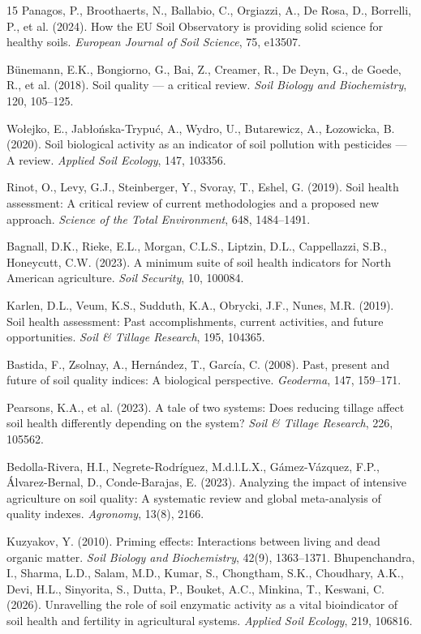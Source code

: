 \documentclass[11pt,a4paper]{article}
\begin{document}
\begin{thebibliography}{15}
Panagos, P., Broothaerts, N., Ballabio, C., Orgiazzi, A., De Rosa, D.,
Borrelli, P., et al. (2024). How the EU Soil Observatory is providing solid
science for healthy soils. \emph{European Journal of Soil Science}, 75, e13507.

Bünemann, E.K., Bongiorno, G., Bai, Z., Creamer, R., De Deyn, G., de Goede, R.,
et al. (2018). Soil quality --- a critical review. \emph{Soil Biology and
Biochemistry}, 120, 105--125.

Wołejko, E., Jabłońska-Trypuć, A., Wydro, U., Butarewicz, A., Łozowicka, B.
(2020). Soil biological activity as an indicator of soil pollution with
pesticides --- A review. \emph{Applied Soil Ecology}, 147, 103356.

Rinot, O., Levy, G.J., Steinberger, Y., Svoray, T., Eshel, G. (2019).
Soil health assessment: A critical review of current methodologies and a
proposed new approach. \emph{Science of the Total Environment}, 648,
1484--1491.

Bagnall, D.K., Rieke, E.L., Morgan, C.L.S., Liptzin, D.L., Cappellazzi, S.B.,
Honeycutt, C.W. (2023). A minimum suite of soil health indicators for North
American agriculture. \emph{Soil Security}, 10, 100084.

Karlen, D.L., Veum, K.S., Sudduth, K.A., Obrycki, J.F., Nunes, M.R. (2019).
Soil health assessment: Past accomplishments, current activities, and future
opportunities. \emph{Soil \& Tillage Research}, 195, 104365.

Bastida, F., Zsolnay, A., Hernández, T., García, C. (2008). Past, present and
future of soil quality indices: A biological perspective. \emph{Geoderma}, 147,
159--171.

Pearsons, K.A., et al. (2023). A tale of two systems: Does reducing tillage affect soil health differently depending on the system? \emph{Soil \& Tillage Research}, 226, 105562.

Bedolla-Rivera, H.I., Negrete-Rodríguez, M.d.l.L.X., Gámez-Vázquez, F.P., Álvarez-Bernal, D., Conde-Barajas, E. (2023). Analyzing the impact of intensive agriculture on soil quality: A systematic review and global meta-analysis of quality indexes. \emph{Agronomy}, 13(8), 2166.

Kuzyakov, Y. (2010). Priming effects: Interactions between living and dead organic matter. \emph{Soil Biology and Biochemistry}, 42(9), 1363--1371.
Bhupenchandra, I., Sharma, L.D., Salam, M.D., Kumar, S., Chongtham, S.K., Choudhary, A.K., Devi, H.L., Sinyorita, S., Dutta, P., Bouket, A.C., Minkina, T., Keswani, C. (2026). Unravelling the role of soil enzymatic activity as a vital bioindicator of soil health and fertility in agricultural systems. \emph{Applied Soil Ecology}, 219, 106816.
\end{thebibliography}
\end{document}
